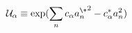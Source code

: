 \begin{equation}
  \label{eq:free8}
  {\cal U}_\alpha\equiv \exp(\sum_n c_\alpha {a^\+_n}^2-c^*_\alpha a_n^2)
\end{equation}

